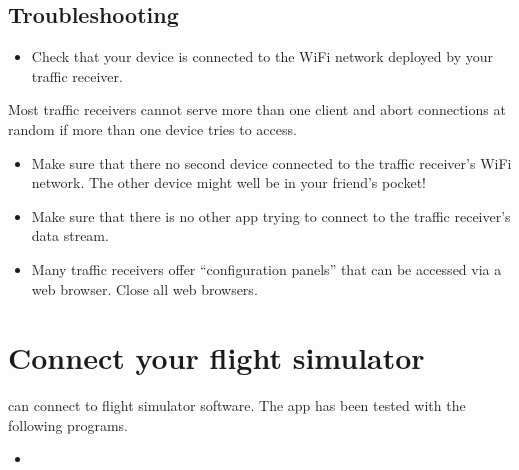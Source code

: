 \documentclass[letterpaper,10pt,english]{sphinxmanual}
\begin{document}
\section{Troubleshooting}
\label{\detokenize{02-steps/traffic:troubleshooting}}
\sphinxAtStartPar
{}
\begin{itemize}
\item {} 
\sphinxAtStartPar
Check that your device is connected to the Wi\sphinxhyphen{}Fi network deployed by your
traffic receiver.

\end{itemize}

\sphinxAtStartPar
{}

\sphinxAtStartPar
Most traffic receivers cannot serve more than one client and abort connections
at random if more than one device tries to access.
\begin{itemize}
\item {} 
\sphinxAtStartPar
Make sure that there no second device connected to the traffic receiver’s
Wi\sphinxhyphen{}Fi network. The other device might well be in your friend’s pocket!

\item {} 
\sphinxAtStartPar
Make sure that there is no other app trying to connect to the traffic
receiver’s data stream.

\item {} 
\sphinxAtStartPar
Many traffic receivers offer “configuration panels” that can be accessed via a
web browser. Close all web browsers.

\end{itemize}


\chapter{Connect your flight simulator}
\label{\detokenize{02-steps/simulator:connect-your-flight-simulator}}\label{\detokenize{02-steps/simulator::doc}}
\sphinxAtStartPar
{} can connect to flight simulator software.  The app
has been tested with the following programs.
\begin{itemize}
\item {} 
\sphinxAtStartPar
{}%
\begin{footnote}[15]\sphinxAtStartFootnote
{}
%
\end{footnote}

\end{itemize}
\end{document}
